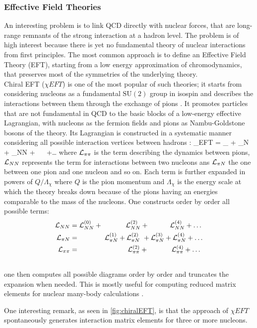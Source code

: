 \subsubsection{Effective Field Theories}
An interesting problem is to link QCD directly with nuclear forces, that are long-range remnants of the strong interaction at a hadron level. The problem is of high interest because there is yet no fundamental theory of nuclear interactions from first principles. The most common approach is to define an Effective Field Theory (EFT), starting from a low energy approximation of chromodynamics, that preserves most of the symmetries of the underlying theory. \\
Chiral EFT ($\chi EFT$) is one of the most popular of such theories; it starts from considering nucleons as a fundamental $\mathrm{SU}(2)$ group in isospin and describes the interactions between them through the exchange of pions \cite{machleidt_chiral_2016}. It promotes particles that are not fundamental in QCD to the basic blocks of a low-energy effective Lagrangian, with nucleons as the fermion fields and pions as Nambu-Goldstone bosons \cite{nambu_dynamical_????} of the theory. Its Lagrangian is constructed in a systematic manner considering all possible interaction vertices between hadrons \cite{epelbaum_nuclear_2010}:
\beq
    \Lagr_{\chi EFT} = \Lagr_{\pi\pi} +  \Lagr_{\pi N} + \Lagr_{NN} + ~ ~+\dots
\eeq 
where $\mathcal{L}_{\pi\pi}$ is the term describing the dynamics between pions, $\mathcal{L}_{NN}$ represents the term for interactions between two nucleons ans $\mathcal{L}_{\pi N}$ the one between one pion and one nucleon and so on. Each term is further expanded in powers of $Q/\Lambda_\chi$ where $Q$ is the pion momentum and $\Lambda_\chi$ is the energy scale at which the theory breaks down because of the pions having an energies comparable to the mass of the nucleons. One constructs order by order all possible terms:
\begin{align}
    \mathcal{L}_{NN} &= \mathcal{L}_{NN}^{(0)} + ~~~~~~~~~~  \mathcal{L}_{NN}^{(2)} + ~~~~~~~~~  \mathcal{L}_{NN}^{(4)} + \dots\\\nonumber
    \mathcal{L}_{\pi N} &= ~~~~~~~~~~~ \mathcal{L}_{\pi N}^{(1)} + \mathcal{L}_{\pi N}^{(2)} ~+  \mathcal{L}_{\pi N}^{(3)} + \mathcal{L}_{\pi N}^{(4)} + \dots  \\\nonumber
    \mathcal{L}_{\pi \pi} &= ~~~~~~~~~~~~~~~~~~~~~ \mathcal{L}_{\pi \pi}^{(2)} +  ~~~~~~~~~~  \mathcal{L}_{\pi \pi}^{(4)} + \dots  \\\nonumber
\end{align} 
one then computes all possible diagrams order by order and truncates the expansion when needed. This is mostly useful for computing reduced matrix elements for nuclear many-body calculations \cite{hagen_coupled-cluster_2014}. 

One interesting remark, as seen in \cref{fig:chiralEFT}, is that the approach of $\chi EFT$ spontaneously generates interaction matrix elements for three or more nucleons. 